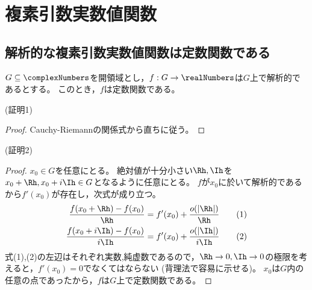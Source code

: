 \chapter{複素引数実数値関数}
    \section{解析的な複素引数実数値関数は定数関数である}
        \label{解析的な複素引数実数値関数は定数関数である}
        \begin{shadebox}
            $G\subseteq\complexNumbers$を開領域とし，$f:G\to\realNumbers$は$G$上で解析的であるとする。
            このとき，$f$は定数関数である。
        \end{shadebox}
        \noindent
        (証明1)
        \begin{proof}
            Cauchy-Riemannの関係式から直ちに従う。
        \end{proof}
        \noindent
        (証明2)
        \begin{proof}
            $x_0\in G$を任意にとる。
            絶対値が十分小さい$\Rh,\Ih$を$x_0+\Rh, x_0+i\Ih \in G$となるように任意にとる。
            $f$が$x_0$に於いて解析的であるから$f'(x_0)$が存在し，次式が成り立つ。
            \begin{align*}
                \frac{f(x_0+\Rh) - f(x_0)}{\Rh} &= f'(x_0) + \frac{o(|\Rh|)}{\Rh} \tag{1}\\
                \frac{f(x_0+i\Ih) - f(x_0)}{i\Ih} &= f'(x_0) + \frac{o(|\Ih|)}{i\Ih} \tag{2}
            \end{align*}
            式(1),(2)の左辺はそれぞれ実数,純虚数であるので，$\Rh\to 0,\Ih\to 0$の極限を考えると，$f'(x_0) = 0$でなくてはならない
            (背理法で容易に示せる)。
            $x_0$は$G$内の任意の点であったから，$f$は$G$上で定数関数である。
        \end{proof}
